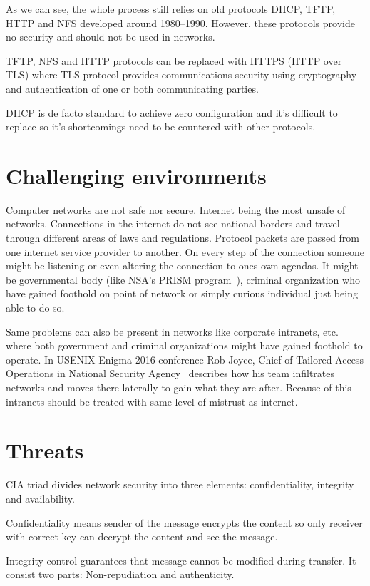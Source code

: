 As we can see, the whole process still relies on old protocols DHCP,
TFTP, HTTP and NFS developed around 1980--1990. However, these
protocols provide no security and should not be used in networks.

TFTP, NFS and HTTP protocols can be replaced with HTTPS (HTTP over
TLS) where TLS protocol provides communications security using
cryptography and authentication of one or both communicating parties.

DHCP is de facto standard to achieve zero configuration and it's
difficult to replace so it's shortcomings need to be countered with
other protocols.

\section{Challenging environments}

Computer networks are not safe nor secure. Internet being the most
unsafe of networks. Connections in the internet do not see national
borders and travel through different areas of laws and
regulations. Protocol packets are passed from one internet service
provider to another. On every step of the connection someone might be
listening or even altering the connection to ones own agendas. It
might be governmental body (like NSA's PRISM
program~\cite{nsa-prism}), criminal organization who have gained
foothold on point of network or simply curious individual just being
able to do so.

Same problems can also be present in networks like corporate
intranets, etc. where both government and criminal organizations might
have gained foothold to operate. In USENIX Enigma 2016 conference Rob
Joyce, Chief of Tailored Access Operations in National Security
Agency~\cite{nsa-tao} describes how his team infiltrates networks and
moves there laterally to gain what they are after. Because of this
intranets should be treated with same level of mistrust as internet.


\section{Threats}

CIA triad divides network security into three elements:
confidentiality, integrity and availability.

Confidentiality means sender of the message encrypts the content so
only receiver with correct key can decrypt the content and see the
message.

Integrity control guarantees that message cannot be modified during
transfer. It consist two parts: Non-repudiation and
authenticity.

